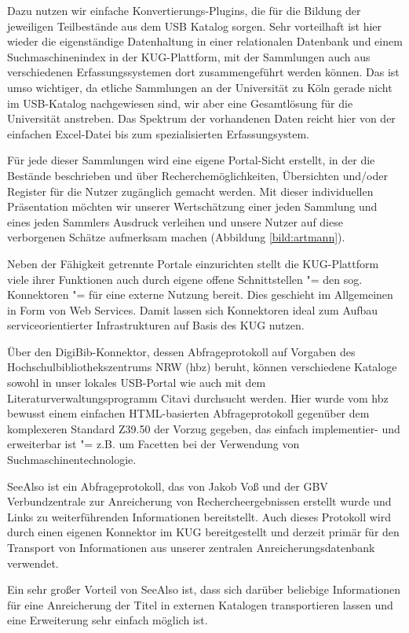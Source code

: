 \documentclass[11pt]{scrartcl}
\begin{document}
Dazu nutzen wir einfache Konvertierungs-Plugins, die für die Bildung
der jeweiligen Teilbestände aus dem USB Katalog sorgen. Sehr
vorteilhaft ist hier wieder die eigenständige Datenhaltung in einer
relationalen Datenbank und einem Suchmaschinenindex in der
KUG-Plattform, mit der Sammlungen auch aus verschiedenen
Erfassungssystemen dort zusammengeführt werden können. Das ist umso
wichtiger, da etliche Sammlungen an der Universität zu Köln gerade
nicht im USB-Katalog nachgewiesen sind, wir aber eine Gesamtlösung für
die Universität anstreben. Das Spektrum der vorhandenen Daten reicht
hier von der einfachen Excel-Datei bis zum spezialisierten
Erfassungsystem.

Für jede dieser Sammlungen wird eine eigene Portal-Sicht erstellt, in
der die Bestände beschrieben und über Recherchemöglichkeiten,
Übersichten und/oder Register für die Nutzer zugänglich gemacht
werden. Mit dieser individuellen Präsentation möchten wir unserer
Wertschätzung einer jeden Sammlung und eines jeden Sammlers Ausdruck
verleihen und unsere Nutzer auf diese verborgenen Schätze aufmerksam
machen (Abbildung \ref{bild:artmann}).

Neben der Fähigkeit getrennte Portale einzurichten stellt die
KUG-Plattform viele ihrer Funktionen auch durch eigene offene
Schnittstellen "= den sog. Konnektoren "= für eine externe Nutzung
bereit. Dies geschieht im Allgemeinen in Form von Web Services. Damit
lassen sich Konnektoren ideal zum Aufbau serviceorientierter
Infrastrukturen auf Basis des KUG nutzen.

Über den DigiBib-Konnektor, dessen Abfrageprotokoll auf Vorgaben des
Hochschulbibliothekszentrums NRW (hbz) beruht, können verschiedene
Kataloge sowohl in unser lokales USB-Portal wie auch mit dem
Literaturverwaltungsprogramm Citavi durchsucht werden. Hier wurde vom
hbz bewusst einem einfachen HTML-basierten Abfrageprotokoll gegenüber
dem komplexeren Standard Z39.50 der Vorzug gegeben, das einfach
implementier- und erweiterbar ist "= z.B. um Facetten bei der
Verwendung von Suchmaschinentechnologie.

SeeAlso\cite{Voss:2008} ist ein Abfrageprotokoll, das von Jakob Voß und
der GBV Verbundzentrale zur Anreicherung von Rechercheergebnissen
erstellt wurde und Links zu weiterführenden Informationen
bereitstellt. Auch dieses Protokoll wird durch einen eigenen Konnektor
im KUG bereitgestellt und derzeit primär für den Transport von
Informationen aus unserer zentralen Anreicherungsdatenbank verwendet.

Ein sehr großer Vorteil von SeeAlso ist, dass sich darüber beliebige
Informationen für eine Anreicherung der Titel in externen Katalogen
transportieren lassen und eine Erweiterung sehr einfach möglich ist.
\end{document}
